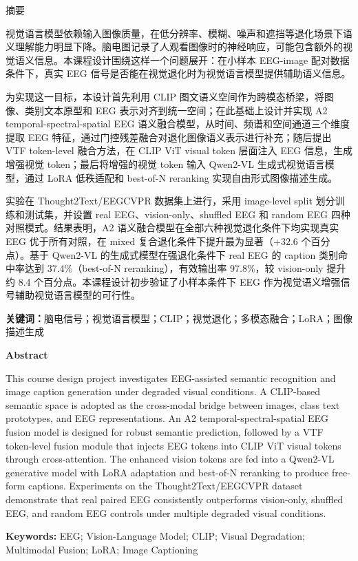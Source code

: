 \begin{center}
{\heitifont{} 摘\quad 要}
\end{center}

视觉语言模型依赖输入图像质量，在低分辨率、模糊、噪声和遮挡等退化场景下语义理解能力明显下降。脑电图记录了人观看图像时的神经响应，可能包含额外的视觉语义信息。本课程设计围绕这样一个问题展开：在小样本 EEG-image 配对数据条件下，真实 EEG 信号是否能在视觉退化时为视觉语言模型提供辅助语义信息。

为实现这一目标，本设计首先利用 CLIP 图文语义空间作为跨模态桥梁，将图像、类别文本原型和 EEG 表示对齐到统一空间；在此基础上设计并实现 A2 temporal-spectral-spatial EEG 语义融合模型，从时间、频谱和空间通道三个维度提取 EEG 特征，通过门控残差融合对退化图像语义表示进行补充；随后提出 VTF token-level 融合方法，在 CLIP ViT visual token 层面注入 EEG 信息，生成增强视觉 token；最后将增强的视觉 token 输入 Qwen2-VL 生成式视觉语言模型，通过 LoRA 低秩适配和 best-of-N reranking 实现自由形式图像描述生成。

实验在 Thought2Text/EEGCVPR 数据集上进行，采用 image-level split 划分训练和测试集，并设置 real EEG、vision-only、shuffled EEG 和 random EEG 四种对照模式。结果表明，A2 语义融合模型在全部六种视觉退化条件下均实现真实 EEG 优于所有对照，在 mixed 复合退化条件下提升最为显著（+32.6 个百分点）。基于 Qwen2-VL 的生成式模型在强退化条件下 real EEG 的 caption 类别命中率达到 37.4\%（best-of-N reranking），有效输出率 97.8\%，较 vision-only 提升约 8.4 个百分点。本课程设计初步验证了小样本条件下 EEG 作为视觉语义增强信号辅助视觉语言模型的可行性。

\vspace{0.5cm}
\noindent\textbf{关键词：}脑电信号；视觉语言模型；CLIP；视觉退化；多模态融合；LoRA；图像描述生成

\clearpage
\begin{center}
{\bfseries{} Abstract}
\end{center}

This course design project investigates EEG-assisted semantic recognition and image caption generation under degraded visual conditions. A CLIP-based semantic space is adopted as the cross-modal bridge between images, class text prototypes, and EEG representations. An A2 temporal-spectral-spatial EEG fusion model is designed for robust semantic prediction, followed by a VTF token-level fusion module that injects EEG tokens into CLIP ViT visual tokens through cross-attention. The enhanced vision tokens are fed into a Qwen2-VL generative model with LoRA adaptation and best-of-N reranking to produce free-form captions. Experiments on the Thought2Text/EEGCVPR dataset demonstrate that real paired EEG consistently outperforms vision-only, shuffled EEG, and random EEG controls under multiple degraded visual conditions.

\vspace{0.5cm}
\noindent\textbf{Keywords:} EEG; Vision-Language Model; CLIP; Visual Degradation; Multimodal Fusion; LoRA; Image Captioning
